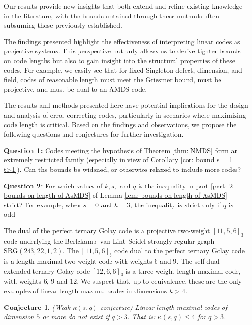 \documentclass[11pt,a4paper]{amsart}
\theoremstyle{plain}
\newtheorem{conjecture}[theorem]{Conjecture}
\theoremstyle{definition}
\theoremstyle{remark}
\begin{document}
	Our results provide new insights that both extend and refine existing knowledge in the literature, with the bounds obtained through these methods often subsuming those previously established.

	The findings presented highlight the effectiveness of interpreting linear codes as projective systems. This perspective not only allows us to derive tighter bounds on code lengths but also to gain insight into the structural properties of these codes. For example, we easily see that for fixed Singleton defect, dimension, and field, codes of reasonable length must meet the Griesmer bound, must be projective, and must be dual to an AMDS code.

	The results and methods presented here have potential implications for the design and analysis of error-correcting codes, particularly in scenarios where maximizing code length is critical.  Based on the findings and observations, we propose the following questions and conjectures for further investigation.

	\newpage
	\noindent \textbf{Question 1:}  Codes meeting the hypothesis of Theorem \ref{thm: NMDS} form an extremely restricted family (especially in view of Corollary \ref{cor: bound s = 1 t>1}).  Can the bounds be widened, or otherwise relaxed to include more codes?

	\noindent \textbf{Question 2:} For which values of $k,s,$ and $q$ is the inequality in part \ref{part: 2 bounds on length of AsMDS} of Lemma \ref{lem: bounds on length of AsMDS} strict? For example, when $s=0$ and $k = 3$, the inequality is strict only if $q$ is odd.

	The dual of the perfect ternary Golay code is a projective two-weight $[11,5,6]_3$ code underlying the Berlekamp–van Lint–Seidel strongly regular graph $\mathrm{SRG}(243,22,1,2)$.
	The $[11,5,6]_3$ code dual to the perfect ternary Golay code is a length-maximal two-weight code with weights $6$ and $9$. The self-dual extended ternary Golay code $[12,6,6]_3$ is a three-weight length-maximal code, with weights $6$, $9$ and $12$. We suspect that, up to equivalence, these are the only examples of linear length maximal codes in dimensions $k>4$.

	\begin{conjecture} (Weak $\kappa(s,q)$ conjecture)
		Linear length-maximal codes of dimension $5$ or more do not exist if $q>3$. That is:  $\kappa(s,q)\le 4$ for $q>3 $.
	\end{conjecture}
\end{document}
